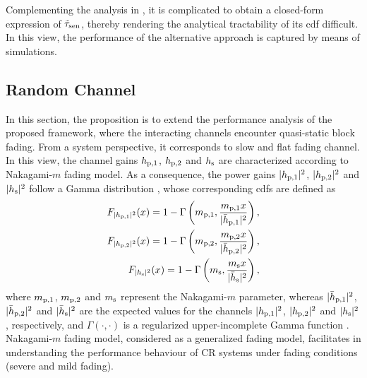 \begin{remark} \label{rm:rem2} 
\normalfont
Complementing the analysis in \cite{Liang08}, it is complicated to obtain a closed-form expression of $\tilde{\tau}_{\text{sen}}$, thereby rendering the analytical tractability of its cdf difficult. In this view, the performance of the alternative approach is captured by means of simulations.
\end{remark} 

\subsection{Random Channel} \label{ssec_IS:ran_th}
In this section, the proposition is to extend the performance analysis of the proposed framework, where the interacting channels encounter quasi-static block fading. From a system perspective, it corresponds to slow and flat fading channel. In this view, the channel gains $h_{\text{p,1}}$, $h_{\text{p,2}}$ and $h_{\text{s}}$ are characterized according to Nakagami-$m$ fading model. As a consequence, the power gains $|h_{\text{p,1}}|^2$, $|h_{\text{p,2}}|^2$ and $|h_{\text{s}}|^2$ follow a Gamma distribution \cite{Goldsmith05}, whose corresponding cdfs are defined as
\begin{align}
F_{|h_{\text{p,1}}|^2}(x) = 1 - \Gamma\left(m_{\text{p,1}}, \frac{m_{\text{p,1}} x}{|\bar{h}_{\text{p,1}}|^2}\right), \label{eq_IS:dis_phpo}\\
F_{|h_{\text{p,2}}|^2}(x) = 1 - \Gamma\left(m_{\text{p,2}}, \frac{m_{\text{p,2}} x}{|\bar{h}_{\text{p,2}}|^2}\right), \label{eq_IS:dis_pght}\\  
F_{|h_{\text{s}}|^2}(x) = 1 - \Gamma\left(m_{\text{s}} , \frac{m_{\text{s}} x}{|\bar{h}_{\text{s}}|^2}\right), \label{eq_IS:dis_phs}
\end{align}
where $m_{\text{p,1}}$, $m_{\text{p,2}}$ and $m_{\text{s}}$ represent the Nakagami-$m$ parameter, whereas $|\bar{h}_{\text{p,1}}|^2$, $|\bar{h}_{\text{p,2}}|^2$ and $|\bar{h}_{\text{s}}|^2$ are the expected values for the channels $|h_{\text{p,1}}|^2$, $|h_{\text{p,2}}|^2$ and $|h_{\text{s}}|^2$, respectively, and $\Gamma(\cdot, \cdot)$ is a regularized upper-incomplete Gamma function \cite{abramo}. Nakagami-$m$ fading model, considered as a generalized fading model, facilitates in understanding the performance behaviour of CR systems under fading conditions (severe and mild fading). 

